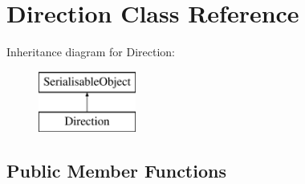 \hypertarget{classDirection}{\section{Direction Class Reference}
\label{classDirection}
}
Inheritance diagram for Direction\-:\begin{figure}[H]
\begin{center}
\leavevmode
\includegraphics[height=2.000000cm]{classDirection}
\end{center}
\end{figure}
\subsection*{Public Member Functions}
